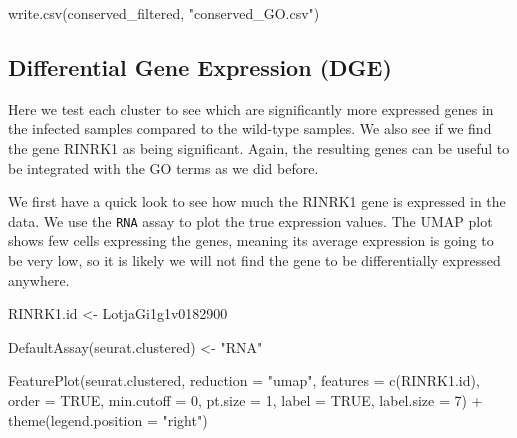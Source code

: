 \documentclass[
  letterpaper,
  DIV=11,
  numbers=noendperiod]{scrartcl}
\newenvironment{Shaded}{\begin{snugshade}}{\end{snugshade}}
\newcommand{\AttributeTok}[1]{\textcolor[rgb]{0.40,0.45,0.13}{#1}}
\newcommand{\ConstantTok}[1]{\textcolor[rgb]{0.56,0.35,0.01}{#1}}
\newcommand{\DecValTok}[1]{\textcolor[rgb]{0.68,0.00,0.00}{#1}}
\newcommand{\FunctionTok}[1]{\textcolor[rgb]{0.28,0.35,0.67}{#1}}
\newcommand{\NormalTok}[1]{\textcolor[rgb]{0.00,0.23,0.31}{#1}}
\newcommand{\OtherTok}[1]{\textcolor[rgb]{0.00,0.23,0.31}{#1}}
\newcommand{\SpecialCharTok}[1]{\textcolor[rgb]{0.37,0.37,0.37}{#1}}
\newcommand{\StringTok}[1]{\textcolor[rgb]{0.13,0.47,0.30}{#1}}
\begin{document}
\begin{Shaded}
\begin{Highlighting}[]
\FunctionTok{write.csv}\NormalTok{(conserved\_filtered, }\StringTok{"conserved\_GO.csv"}\NormalTok{)}
\end{Highlighting}
\end{Shaded}

\subsection{Differential Gene Expression
(DGE)}\label{differential-gene-expression-dge}

Here we test each cluster to see which are significantly more expressed
genes in the infected samples compared to the wild-type samples. We also
see if we find the gene RINRK1 as being significant. Again, the
resulting genes can be useful to be integrated with the GO terms as we
did before.

We first have a quick look to see how much the RINRK1 gene is expressed
in the data. We use the \texttt{RNA} assay to plot the true expression
values. The UMAP plot shows few cells expressing the genes, meaning its
average expression is going to be very low, so it is likely we will not
find the gene to be differentially expressed anywhere.

\begin{Shaded}
\begin{Highlighting}[]
\NormalTok{RINRK1.id }\OtherTok{\textless{}{-}} \StringTok{\textquotesingle{}LotjaGi1g1v0182900\textquotesingle{}}

\FunctionTok{DefaultAssay}\NormalTok{(seurat.clustered) }\OtherTok{\textless{}{-}} \StringTok{"RNA"}

\FunctionTok{FeaturePlot}\NormalTok{(seurat.clustered,}
            \AttributeTok{reduction =} \StringTok{"umap"}\NormalTok{, }
            \AttributeTok{features =} \FunctionTok{c}\NormalTok{(RINRK1.id), }
            \AttributeTok{order =} \ConstantTok{TRUE}\NormalTok{,}
            \AttributeTok{min.cutoff =} \DecValTok{0}\NormalTok{, }
            \AttributeTok{pt.size =} \DecValTok{1}\NormalTok{,}
            \AttributeTok{label =} \ConstantTok{TRUE}\NormalTok{,}
            \AttributeTok{label.size =} \DecValTok{7}\NormalTok{) }\SpecialCharTok{+} \FunctionTok{theme}\NormalTok{(}\AttributeTok{legend.position =} \StringTok{"right"}\NormalTok{)}
\end{Highlighting}
\end{Shaded}
\end{document}
